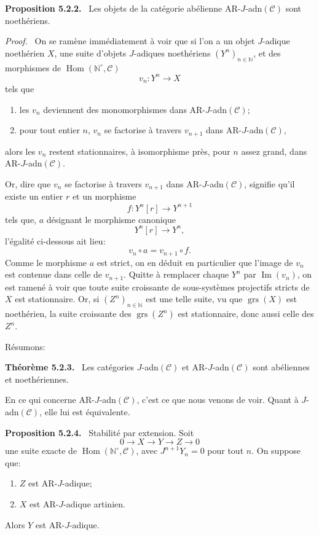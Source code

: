 \documentclass[11pt]{article}
\newenvironment{statement}[1]{\par\medskip\noindent\textbf{#1.}\ }{\par\medskip}
\newenvironment{prooftext}[1][Proof]{\par\noindent\emph{#1.}\ }{\par\medskip}
\DeclareMathOperator{\Hom}{Hom}
\providecommand{\Hom}{\operatorname{Hom}}
\providecommand{\Im}{\operatorname{Im}}
\renewcommand{\Im}{\operatorname{Im}}
\providecommand{\grs}{\operatorname{grs}}
\providecommand{\Im}{\operatorname{Im}}
\begin{document}
\begin{statement}{Proposition 5.2.2}
Les objets de la catégorie abélienne AR-\(J\)-adn\((\mathcal C)\) sont noethériens.
\end{statement}

\begin{prooftext}
On se ramène immédiatement à voir que si l'on a un objet \(J\)-adique noethérien \(X\), une suite d'objets \(J\)-adiques noethériens \((Y^n)_{n\in\mathbb N}\), et des morphismes de \(\Hom(\mathbb N^\circ,\mathcal C)\)
\[
v_n:Y^n\longrightarrow X
\]
tels que
\begin{enumerate}[label=\textup{(\roman*)}]
\item les \(v_n\) deviennent des monomorphismes dans AR-\(J\)-adn\((\mathcal C)\);
\item pour tout entier \(n\), \(v_n\) se factorise à travers \(v_{n+1}\) dans AR-\(J\)-adn\((\mathcal C)\),
\end{enumerate}
alors les \(v_n\) restent stationnaires, à isomorphisme près, pour \(n\) assez grand, dans AR-\(J\)-adn\((\mathcal C)\).

Or, dire que \(v_n\) se factorise à travers \(v_{n+1}\) dans AR-\(J\)-adn\((\mathcal C)\), signifie qu'il existe un entier \(r\) et un morphisme
\[
f:Y^n[r]\longrightarrow Y^{n+1}
\]
tels que, \(a\) désignant le morphisme canonique
\[
Y^n[r]\longrightarrow Y^n,
\]
l'égalité ci-dessous ait lieu:
\[
v_n\circ a=v_{n+1}\circ f .
\]
Comme le morphisme \(a\) est strict, on en déduit en particulier que l'image de \(v_n\) est contenue dans celle de \(v_{n+1}\). Quitte à remplacer chaque \(Y^n\) par \(\Im(v_n)\), on est ramené à voir que toute suite croissante de sous-systèmes projectifs stricts de \(X\) est stationnaire. Or, si \((Z^n)_{n\in\mathbb N}\) est une telle suite, vu que \(\grs(X)\) est noethérien, la suite croissante des \(\grs(Z^n)\) est stationnaire, donc aussi celle des \(Z^n\).
\end{prooftext}

Résumons:

\begin{statement}{Théorème 5.2.3}
Les catégories \(J\)-adn\((\mathcal C)\) et AR-\(J\)-adn\((\mathcal C)\) sont abéliennes et noethériennes.
\end{statement}

En ce qui concerne AR-\(J\)-adn\((\mathcal C)\), c'est ce que nous venons de voir. Quant à \(J\)-adn\((\mathcal C)\), elle lui est équivalente.

\begin{statement}{Proposition 5.2.4}
Stabilité par extension. Soit
\[
0\longrightarrow X\longrightarrow Y\longrightarrow Z\longrightarrow0
\]
une suite exacte de \(\Hom(\mathbb N^\circ,\mathcal C)\), avec \(J^{n+1}Y_n=0\) pour tout \(n\). On suppose que:
\begin{enumerate}[label=\textup{(\roman*)}]
\item \(Z\) est AR-\(J\)-adique;
\item \(X\) est AR-\(J\)-adique artinien.
\end{enumerate}
Alors \(Y\) est AR-\(J\)-adique.
\end{statement}
\end{document}
